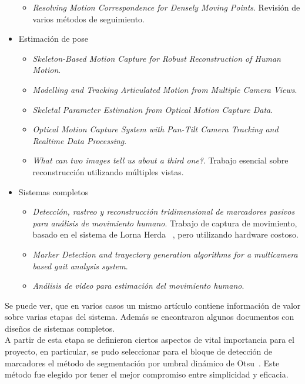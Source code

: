 \begin{itemize}
\begin{itemize}
		\item \emph{Resolving Motion Correspondence for Densely Moving Points}\cite{survey_tracking}. Revisión de varios métodos de seguimiento.
	\end{itemize}
	\item Estimación de pose
	\begin{itemize}
		\item \emph{Skeleton-Based Motion Capture for Robust Reconstruction of Human Motion}\cite{herda}.
		\item \emph{Modelling and Tracking Articulated Motion from Multiple Camera Views}\cite{ringer2000modelling}.
		\item \emph{Skeletal Parameter Estimation from Optical Motion Capture Data}\cite{kirk2005skeletal}.
		\item \emph{Optical Motion Capture System with Pan-Tilt Camera Tracking and  Realtime Data Processing}\cite{kurihara2002optical}.
		\item \emph{What can two images tell us about a third one?}\cite{faugueras}. Trabajo esencial sobre reconstrucción utilizando múltiples vistas.
	\end{itemize}
	\item Sistemas completos
	\begin{itemize}
		\item \emph{Detección, rastreo y reconstrucción tridimensional de marcadores pasivos para análisis de movimiento humano}\cite{colombianos}.	Trabajo de captura de movimiento, basado en el sistema de Lorna Herda ~\cite{herda}, pero utilizando hardware costoso.
		\item \emph{Marker Detection and trayectory generation algorithms for a multicamera based gait analysis system}\cite{shafiq2001marker}.
		\item \emph{Análisis de video para estimación del movimiento humano}\cite{martinez2009analisis}.
	\end{itemize}
\end{itemize}

Se puede ver, que en varios casos un mismo artículo contiene información de valor sobre varias etapas del sistema. Además se encontraron algunos documentos con diseños de sistemas completos.
\\ 

A partir de esta etapa se definieron ciertos aspectos de vital importancia para el proyecto, en particular, se pudo seleccionar para el bloque de detección de marcadores el método de segmentación por umbral dinámico de Otsu~\cite{otsu}. Este método fue elegido por tener el mejor compromiso entre simplicidad y eficacia.
\\ 

